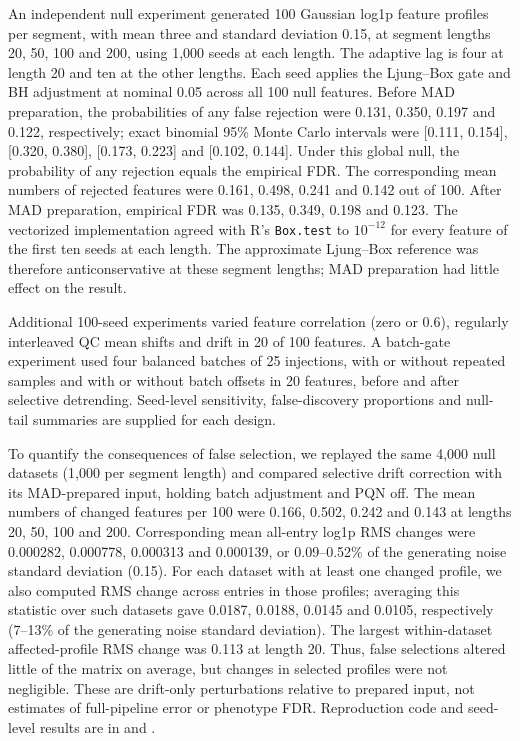 \documentclass[namedate,webpdf,modern,large,nocrop]{oup-authoring-template}
\begin{document}
An independent null experiment generated 100 Gaussian log1p feature profiles per segment, with mean three and standard deviation 0.15, at segment lengths 20, 50, 100 and 200, using 1,000 seeds at each length. The adaptive lag is four at length 20 and ten at the other lengths. Each seed applies the Ljung--Box gate and BH adjustment at nominal 0.05 across all 100 null features. Before MAD preparation, the probabilities of any false rejection were 0.131, 0.350, 0.197 and 0.122, respectively; exact binomial 95\% Monte Carlo intervals were [0.111, 0.154], [0.320, 0.380], [0.173, 0.223] and [0.102, 0.144]. Under this global null, the probability of any rejection equals the empirical FDR. The corresponding mean numbers of rejected features were 0.161, 0.498, 0.241 and 0.142 out of 100. After MAD preparation, empirical FDR was 0.135, 0.349, 0.198 and 0.123. The vectorized implementation agreed with R's \texttt{Box.test} to $10^{-12}$ for every feature of the first ten seeds at each length. The approximate Ljung--Box reference was therefore anticonservative at these segment lengths; MAD preparation had little effect on the result.

Additional 100-seed experiments varied feature correlation (zero or 0.6), regularly interleaved QC mean shifts and drift in 20 of 100 features. A batch-gate experiment used four balanced batches of 25 injections, with or without repeated samples and with or without batch offsets in 20 features, before and after selective detrending. Seed-level sensitivity, false-discovery proportions and null-tail summaries are supplied for each design.

To quantify the consequences of false selection, we replayed the same 4,000 null datasets (1,000 per segment length) and compared selective drift correction with its MAD-prepared input, holding batch adjustment and PQN off. The mean numbers of changed features per 100 were 0.166, 0.502, 0.242 and 0.143 at lengths 20, 50, 100 and 200. Corresponding mean all-entry log1p RMS changes were 0.000282, 0.000778, 0.000313 and 0.000139, or 0.09--0.52\% of the generating noise standard deviation (0.15). For each dataset with at least one changed profile, we also computed RMS change across entries in those profiles; averaging this statistic over such datasets gave 0.0187, 0.0188, 0.0145 and 0.0105, respectively (7--13\% of the generating noise standard deviation). The largest within-dataset affected-profile RMS change was 0.113 at length 20. Thus, false selections altered little of the matrix on average, but changes in selected profiles were not negligible. These are drift-only perturbations relative to prepared input, not estimates of full-pipeline error or phenotype FDR. Reproduction code and seed-level results are in  and .
\end{document}
